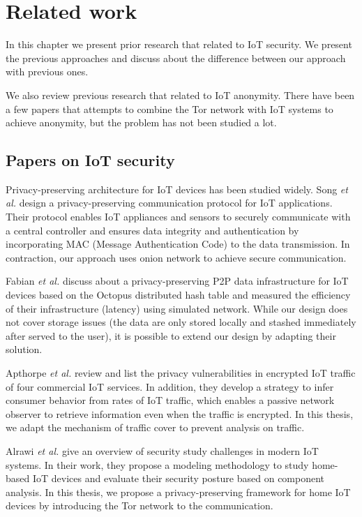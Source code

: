 \chapter{Related work}

In this chapter we present prior research that related to IoT security.  We present the previous approaches and discuss about the difference between our approach with previous ones.

We also review previous research that related to IoT anonymity. There have been a few papers that attempts to combine the Tor network with IoT systems to achieve anonymity, but the problem has not been studied a lot.

\section{Papers on IoT security}

Privacy-preserving architecture for IoT devices has been studied widely. Song \textit{et al.} \cite{song2017privacy} design a privacy-preserving communication protocol for IoT applications. Their protocol enables IoT appliances and sensors to securely communicate with a central controller and ensures data integrity and authentication by incorporating MAC (Message Authentication Code) to the data transmission. In contraction, our approach uses onion network to achieve secure communication.

Fabian \textit{et al.} \cite{fabian2014privacy} discuss about a privacy-preserving P2P data infrastructure for IoT devices based on the Octopus distributed hash table \cite{wang2012octopus} and measured the efficiency of their infrastructure (latency) using simulated network. While our design does not cover storage issues (the data are only stored locally and stashed immediately after served to the user), it is possible to extend our design by adapting their solution.

Apthorpe \textit{et al.} \cite{apthorpe2017smart} review and list the privacy vulnerabilities in encrypted IoT traffic of four commercial IoT services. In addition, they develop a strategy to infer consumer behavior from rates of IoT traffic, which enables a passive network observer to retrieve information even when the traffic is encrypted. In this thesis, we adapt the mechanism of traffic cover to prevent analysis on traffic.

Alrawi \textit{et al.} \cite{alrawi2019sok} give an overview of security study challenges in modern IoT systems. In their work, they propose a modeling methodology to study home-based IoT devices and evaluate their security posture based on component analysis. In this thesis, we propose a privacy-preserving framework for home IoT devices by introducing the Tor network to the communication. 




